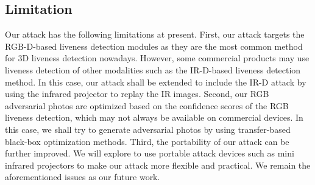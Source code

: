 

\subsection{Limitation}
Our attack has the following limitations at present. 
First, our attack targets the RGB-D-based liveness detection modules as they are the most common method for 3D liveness detection nowadays. However, some commercial products may use liveness detection of other modalities such as the IR-D-based liveness detection method. In this case, our attack shall be extended to include the IR-D attack by using the infrared projector to replay the IR images.
Second, our RGB adversarial photos are optimized based on the confidence scores of the RGB liveness detection, which may not always be available on commercial devices. In this case, we shall try to generate adversarial photos by using transfer-based black-box optimization methods.
Third, the portability of our attack can be further improved. We will explore to use portable attack devices such as mini infrared projectors to make our attack more flexible and practical. We remain the aforementioned issues as our future work.
